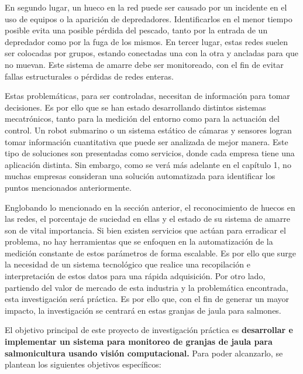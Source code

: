 En segundo lugar, un hueco en la red puede ser causado por un incidente en el uso de equipos o la aparición de depredadores. Identificarlos en el menor tiempo posible evita una posible pérdida del pescado, tanto por la entrada de un depredador como por la fuga de los mismos. En tercer lugar, estas redes suelen ser colocadas por grupos, estando conectadas una con la otra y ancladas para que no muevan. Este sistema de amarre debe ser monitoreado, con el fin de evitar fallas estructurales o pérdidas de redes enteras. 

Estas problemáticas, para ser controladas, necesitan de información para tomar decisiones. Es por ello que se han estado desarrollando distintos sistemas mecatrónicos, tanto para la medición del entorno como para la actuación del control. Un robot submarino o un sistema estático de cámaras y sensores logran tomar información cuantitativa que puede ser analizada de mejor manera. Este tipo de soluciones son presentadas como servicios, donde cada empresa tiene una aplicación distinta. Sin embargo, como se verá más adelante en el capítulo 1, no muchas empresas consideran una solución automatizada para identificar los puntos mencionados anteriormente. 


Englobando lo mencionado en la sección anterior, el reconocimiento de huecos en las redes, el porcentaje de suciedad en ellas y el estado de su sistema de amarre son de vital importancia. Si bien existen servicios que actúan para erradicar el problema, no hay herramientas que se enfoquen en la automatización de la medición constante de estos parámetros de forma escalable. Es por ello que surge la necesidad de un sistema tecnológico que realice una recopilación e interpretación de estos datos para una rápida adquisición. Por otro lado, partiendo del valor de mercado de esta industria y la problemática encontrada, esta investigación será práctica. Es por ello que, con el fin de generar un mayor impacto, la investigación se centrará en estas granjas de jaula para salmones.  


El objetivo principal de este proyecto de investigación práctica es \textbf{desarrollar e implementar un sistema para monitoreo de granjas de jaula para salmonicultura usando visión computacional.} Para poder alcanzarlo, se plantean los siguientes objetivos específicos:

